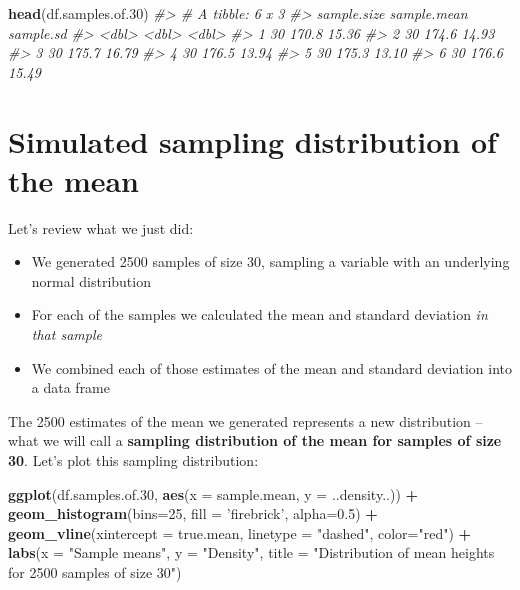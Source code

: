 \documentclass[]{book}
\newenvironment{Shaded}{\begin{snugshade}}{\end{snugshade}}
\newcommand{\CommentTok}[1]{\textcolor[rgb]{0.56,0.35,0.01}{\textit{#1}}}
\newcommand{\DataTypeTok}[1]{\textcolor[rgb]{0.13,0.29,0.53}{#1}}
\newcommand{\DecValTok}[1]{\textcolor[rgb]{0.00,0.00,0.81}{#1}}
\newcommand{\FloatTok}[1]{\textcolor[rgb]{0.00,0.00,0.81}{#1}}
\newcommand{\KeywordTok}[1]{\textcolor[rgb]{0.13,0.29,0.53}{\textbf{#1}}}
\newcommand{\NormalTok}[1]{#1}
\newcommand{\OperatorTok}[1]{\textcolor[rgb]{0.81,0.36,0.00}{\textbf{#1}}}
\newcommand{\StringTok}[1]{\textcolor[rgb]{0.31,0.60,0.02}{#1}}
\providecommand{\tightlist}{%
  \setlength{\itemsep}{0pt}\setlength{\parskip}{0pt}}
\theoremstyle{definition}
\theoremstyle{definition}
\theoremstyle{definition}
\theoremstyle{remark}
\begin{document}
\begin{Shaded}
\begin{Highlighting}[]
\KeywordTok{head}\NormalTok{(df.samples.of}\FloatTok{.30}\NormalTok{)}
\CommentTok{#> # A tibble: 6 x 3}
\CommentTok{#>   sample.size sample.mean sample.sd}
\CommentTok{#>         <dbl>       <dbl>     <dbl>}
\CommentTok{#> 1          30       170.8     15.36}
\CommentTok{#> 2          30       174.6     14.93}
\CommentTok{#> 3          30       175.7     16.79}
\CommentTok{#> 4          30       176.5     13.94}
\CommentTok{#> 5          30       175.3     13.10}
\CommentTok{#> 6          30       176.6     15.49}
\end{Highlighting}
\end{Shaded}

\hypertarget{simulated-sampling-distribution-of-the-mean}{%
\section{Simulated sampling distribution of the
mean}\label{simulated-sampling-distribution-of-the-mean}}

Let's review what we just did:

\begin{itemize}
\tightlist
\item
  We generated 2500 samples of size 30, sampling a variable with an
  underlying normal distribution
\item
  For each of the samples we calculated the mean and standard deviation
  \emph{in that sample}
\item
  We combined each of those estimates of the mean and standard deviation
  into a data frame
\end{itemize}

The 2500 estimates of the mean we generated represents a new
distribution -- what we will call a \textbf{sampling distribution of the
mean for samples of size 30}. Let's plot this sampling distribution:

\begin{Shaded}
\begin{Highlighting}[]
\KeywordTok{ggplot}\NormalTok{(df.samples.of}\FloatTok{.30}\NormalTok{, }\KeywordTok{aes}\NormalTok{(}\DataTypeTok{x =}\NormalTok{ sample.mean, }\DataTypeTok{y =}\NormalTok{ ..density..)) }\OperatorTok{+}
\StringTok{  }\KeywordTok{geom_histogram}\NormalTok{(}\DataTypeTok{bins=}\DecValTok{25}\NormalTok{, }\DataTypeTok{fill =} \StringTok{'firebrick'}\NormalTok{, }\DataTypeTok{alpha=}\FloatTok{0.5}\NormalTok{) }\OperatorTok{+}\StringTok{ }
\StringTok{  }\KeywordTok{geom_vline}\NormalTok{(}\DataTypeTok{xintercept =}\NormalTok{ true.mean, }\DataTypeTok{linetype =} \StringTok{"dashed"}\NormalTok{, }\DataTypeTok{color=}\StringTok{"red"}\NormalTok{) }\OperatorTok{+}\StringTok{ }
\StringTok{  }\KeywordTok{labs}\NormalTok{(}\DataTypeTok{x =} \StringTok{"Sample means"}\NormalTok{, }\DataTypeTok{y  =} \StringTok{"Density"}\NormalTok{,}
       \DataTypeTok{title =} \StringTok{"Distribution of mean heights for 2500 samples of size 30"}\NormalTok{)}
\end{Highlighting}
\end{Shaded}
\end{document}
